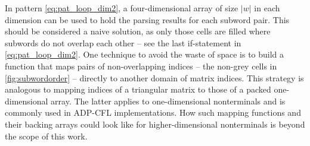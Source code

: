 \documentclass[
    a4paper,
    12pt,
    twoside,
    BCOR=12mm,
    parskip=half,
    chapterprefix,
    numbers=noenddot,
    bibliography=totoc
]{scrbook}
\begin{document}

\begin{remark}
  In pattern \ref{eq:pat_loop_dim2}, a four-dimensional array of size $|w|$ in each dimension can be used to hold the parsing results for each subword pair. This should be considered a naive solution, as only those cells are filled where subwords do not overlap each other -- see the last if-statement in \ref{eq:pat_loop_dim2}. One technique to avoid the waste of space is to build a function that maps pairs of non-overlapping indices -- the non-grey cells in \cref{fig:subwordorder} -- directly to another domain of matrix indices. This strategy is analogous to mapping indices of a triangular matrix to those of a packed one-dimensional array. The latter applies to one-dimensional nonterminals and is commonly used in ADP-CFL implementations. How such mapping functions and their backing arrays could look like for higher-dimensional nonterminals is beyond the scope of this work.
\end{remark}

\newcommand{\fc}{\cellcolor[gray]{.8}}
\end{document}
